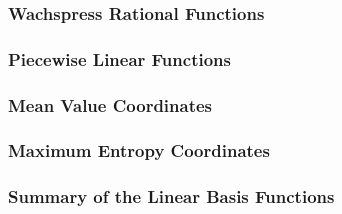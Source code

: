 \documentclass[compress,10pt]{beamer}
\begin{document}
\begin{frame}[t]\frametitle{Wachspress Rational Functions}

\end{frame}
\begin{frame}[t]\frametitle{Piecewise Linear Functions}

\end{frame}
\begin{frame}[t]\frametitle{Mean Value Coordinates}

\end{frame}
\begin{frame}[t]\frametitle{Maximum Entropy Coordinates}

\end{frame}
\begin{frame}[t]\frametitle{Summary of the Linear Basis Functions}

\end{frame}
\end{document}
